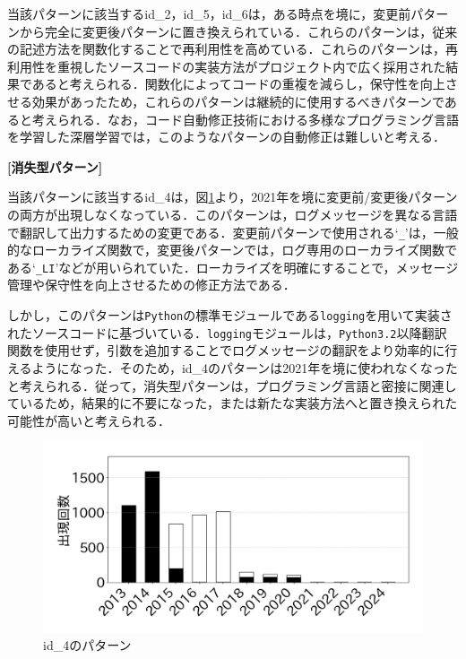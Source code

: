 \documentclass[11pt]{jreport}
\begin{document}
当該パターンに該当するid\_2，id\_5，id\_6は，ある時点を境に，変更前パターンから完全に変更後パターンに置き換えられている．これらのパターンは，従来の記述方法を関数化することで再利用性を高めている．これらのパターンは，再利用性を重視したソースコードの実装方法がプロジェクト内で広く採用された結果であると考えられる．関数化によってコードの重複を減らし，保守性を向上させる効果があったため，これらのパターンは継続的に使用するべきパターンであると考えられる．なお，コード自動修正技術における多様なプログラミング言語を学習した深層学習では，このようなパターンの自動修正は難しいと考える．

\noindent\textbf{[消失型パターン] }


当該パターンに該当するid\_4は，図\ref{table:id_4}より，2021年を境に変更前/変更後パターンの両方が出現しなくなっている．このパターンは，ログメッセージを異なる言語で翻訳して出力するための変更である．変更前パターンで使用される`\texttt{\_}'は，一般的なローカライズ関数で，変更後パターンでは，ログ専用のローカライズ関数である`\texttt{\_LI}'などが用いられていた．ローカライズを明確にすることで，メッセージ管理や保守性を向上させるための修正方法である．

しかし，このパターンは\texttt{Python}の標準モジュールである\texttt{logging}を用いて実装されたソースコードに基づいている．\texttt{logging}モジュールは，\texttt{Python3.2}以降翻訳関数を使用せず，引数を追加することでログメッセージの翻訳をより効率的に行えるようになった．そのため，id\_4のパターンは2021年を境に使われなくなったと考えられる．従って，消失型パターンは，プログラミング言語と密接に関連しているため，結果的に不要になった，または新たな実装方法へと置き換えられた可能性が高いと考えられる．

\begin{figure}[h]
    \centering
        \includegraphics[width=0.8\linewidth]{@BSthesis2024_Noguchi/Noguchi_fig/id_4.png}
        \vspace{-4mm}
        \caption{id\_4のパターン}
        \label{table:id_4}
\end{figure}
\end{document}
